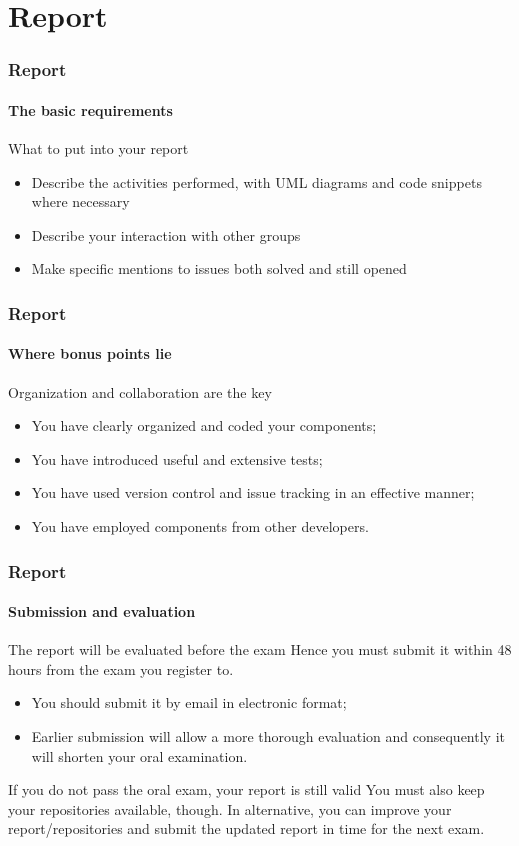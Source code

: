 \section{Report}

\begin{frame}
\frametitle{Report}
\framesubtitle{The basic requirements}

\begin{block}{What to put into your report}
\begin{itemize}
\item Describe the activities performed, with UML diagrams and code snippets where necessary
\item Describe your interaction with other groups
\item Make specific mentions to issues both solved and still opened
\end{itemize}
\end{block}
\end{frame}

\begin{frame}
\frametitle{Report}
\framesubtitle{Where bonus points lie}

\begin{block}{Organization and collaboration are the key}
\begin{itemize}
\item You have clearly organized and coded your components;
\item You have introduced useful and extensive tests;
\item You have used version control and issue tracking in an effective manner;
\item You have employed components from other developers.
\end{itemize}
\end{block}
\end{frame}

\begin{frame}
\frametitle{Report}
\framesubtitle{Submission and evaluation}

\begin{block}{The report will be evaluated before the exam}
Hence you must submit it within 48 hours from the exam you register to.
\begin{itemize}
\item You should submit it by email in electronic format;
\item Earlier submission will allow a more thorough evaluation and consequently it will shorten your oral examination.
\end{itemize}
\end{block}
\pause
\begin{block}{If you do not pass the oral exam, your report is still valid}
You must also keep your repositories available, though. 
In alternative, you can improve your report/repositories and submit the updated report in time for the next exam.
\end{block}
\end{frame}
